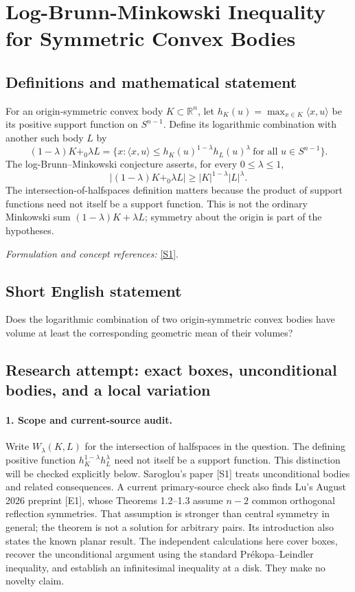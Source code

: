 \documentclass[11pt]{article}
\begin{document}
\section*{\texorpdfstring{Log-Brunn-Minkowski Inequality for Symmetric Convex Bodies}{Log-Brunn-Minkowski Inequality for Symmetric Convex Bodies}}\label{30006873}
\subsection{Definitions and mathematical statement}
For an origin-symmetric convex body $K\subset{\mathbb{R}}^n$, let $h_K(u)=\max_{x\in K}\langle x,u\rangle$ be its positive support function on $S^{n-1}$. Define its logarithmic combination with another such body $L$ by
\[
 (1-\lambda)K+_0\lambda L
 =\{x:\langle x,u\rangle\le
 h_K(u)^{1-\lambda}h_L(u)^\lambda\ \text{for all }u\in S^{n-1}\}.
\]
The log-Brunn--Minkowski conjecture asserts, for every $0\le\lambda\le1$,
\[
 |(1-\lambda)K+_0\lambda L|\ge |K|^{1-\lambda}|L|^\lambda.
\]
The intersection-of-halfspaces definition matters because the product of support functions need not itself be a support function. This is not the ordinary Minkowski sum $(1-\lambda)K+\lambda L$; symmetry about the origin is part of the hypotheses.
\par\smallskip\textit{Formulation and concept references:} \href{https://arxiv.org/abs/1311.4954}{[S1]}.

\subsection{Short English statement}
Does the logarithmic combination of two origin-symmetric convex bodies have volume at least the corresponding geometric mean of their volumes?
\subsection{Research attempt: exact boxes, unconditional bodies, and a local variation}
\paragraph{1. Scope and current-source audit.}
Write $W_\lambda(K,L)$ for the intersection of halfspaces in the question. The defining positive function $h_K^{1-\lambda}h_L^\lambda$ need not itself be a support function. This distinction will be checked explicitly below. Saroglou's paper [S1] treats unconditional bodies and related consequences. A current primary-source check also finds Lu's August 2026 preprint [E1], whose Theorems 1.2--1.3 assume $n-2$ common orthogonal reflection symmetries. That assumption is stronger than central symmetry in general; the theorem is not a solution for arbitrary pairs. Its introduction also states the known planar result. The independent calculations here cover boxes, recover the unconditional argument using the standard Pr\'ekopa--Leindler inequality, and establish an infinitesimal inequality at a disk. They make no novelty claim.
\end{document}
